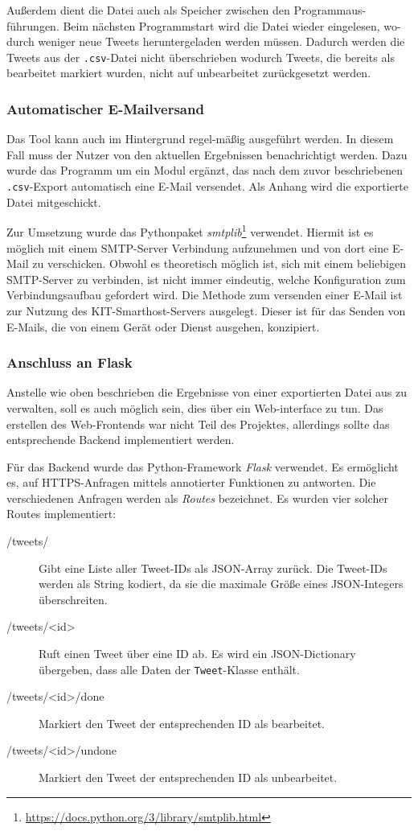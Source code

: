 \documentclass[runningheads]{llncs}
\begin{document}
Außerdem dient die Datei auch als Speicher zwischen den Programmaus-führungen.
Beim nächsten Programmstart wird die Datei wieder eingelesen, wo-durch weniger neue Tweets heruntergeladen werden müssen.
Dadurch werden die Tweets aus der \texttt{.csv}-Datei nicht überschrieben wodurch Tweets, die bereits als bearbeitet markiert wurden, nicht auf unbearbeitet zurückgesetzt werden.

\subsubsection{Automatischer E-Mailversand}
Das Tool kann auch im Hintergrund regel-mäßig ausgeführt werden.
In diesem Fall muss der Nutzer von den aktuellen Ergebnissen benachrichtigt werden.
Dazu wurde das Programm um ein Modul ergänzt, das nach dem zuvor beschriebenen \texttt{.csv}-Export automatisch eine E-Mail versendet.
Als Anhang wird die exportierte Datei mitgeschickt.

Zur Umsetzung wurde das Pythonpaket \textit{smtplib}\footnote{\url{https://docs.python.org/3/library/smtplib.html}} verwendet.
Hiermit ist es möglich mit einem SMTP-Server Verbindung aufzunehmen und von dort eine E-Mail zu verschicken.
Obwohl es theoretisch möglich ist, sich mit einem beliebigen SMTP-Server zu verbinden, ist nicht immer eindeutig, welche Konfiguration zum Verbindungsaufbau gefordert wird.
Die Methode zum versenden einer E-Mail ist zur Nutzung des KIT-Smarthost-Servers ausgelegt.
Dieser ist für das Senden von E-Mails, die von einem Gerät oder Dienst ausgehen, konzipiert.

\subsubsection{Anschluss an Flask}
Anstelle wie oben beschrieben die Ergebnisse von einer exportierten Datei aus zu verwalten, soll es auch möglich sein, dies über ein Web-interface zu tun.
Das erstellen des Web-Frontends war nicht Teil des Projektes, allerdings sollte das entsprechende Backend implementiert werden.

Für das Backend wurde das Python-Framework \textit{Flask} verwendet.
Es ermöglicht es, auf HTTPS-Anfragen mittels annotierter Funktionen zu antworten.
Die verschiedenen Anfragen werden als \textit{Routes} bezeichnet.
Es wurden vier solcher Routes implementiert:

\begin{description}
    \item [/tweets/] Gibt eine Liste aller Tweet-IDs als JSON-Array zurück.
        Die Tweet-IDs werden als String kodiert, da sie die maximale Größe eines JSON-Integers überschreiten.
    \item [/tweets/\textless id\textgreater] Ruft einen Tweet über eine ID ab.
        Es wird ein JSON-Dictionary übergeben, dass alle Daten der \texttt{Tweet}-Klasse enthält.
    \item [/tweets/\textless id\textgreater/done] Markiert den Tweet der entsprechenden ID als bearbeitet.
    \item [/tweets/\textless id\textgreater/undone] Markiert den Tweet der entsprechenden ID als unbearbeitet.
\end{description}
\end{document}
